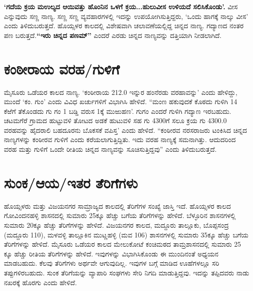 \textbf{‘ಗದೆಯ ಕ್ರಯ ಮಉಲ್ಯದ ಆಯಿವತ್ತು ಹೊಂನಿನ ಒಳಗೆ ಕ್ರಯ...ಹುಲುವೀಸ ಉಳಿಯದೆ ಸಲಿಸಿಕೊಂಡು’.} ವೀಸ ಎನ್ನುವುದು ಸಣ್ಣ ನಾಣ್ಯ. ಸಣ್ಣ ಸಣ್ಣ ವ್ಯವಹಾರಗಳಲ್ಲಿ ಇದನ್ನು ಉಪಯೋಗಿಸುತ್ತಿದ್ದರು, ‘ಒಂದು ಹಾಗಕ್ಕೆ ನಾಲ್ಕು ವೀಸ’ ಎಂದು ತಿಳಿದುಬರುತ್ತದೆ. ಹೊಯ್ಸಳರ ಕಾಲದಲ್ಲಿ ವಿಶೇಷವಾಗಿ ಚಲಾವಣೆಯಲ್ಲಿದ್ದ ಚಿನ್ನದ ನಾಣ್ಯ. ಗದ್ಯಾಣದ ನಂತರ ಪಣ ಬರುತ್ತದೆ.\textbf{“ಇರು ಚಿನ್ನದ ಪಣಮ್”} ಎಂದರೆ ಎರಡು ಚಿನ್ನದ ನಾಣ್ಯವನ್ನು ದತ್ತಿಯಾಗಿ ನೀಡಲಾಗಿದೆ.


\section{ಕಂಠೀರಾಯ ವರಹ/ಗುಳಿಗೆ}

ಮೈಸೂರು ಒಡೆಯರ ಕಾಲದ ನಾಣ್ಯ. ‘ಕಂಠೀರಾಯ 212.0 ಇನ್ನುರ ಹಂನೆರಡು ವರಹಾವನ್ನು’ ಎಂದು ಹೇಳಿದ್ದು, ಮುಂದೆ ‘ಕಂ. ಗುಂ’ ಎಂದು ವಿವಿಧ ಖರ್ಚುಗಳಿಗೆ ವಿಭಾಗಿಸಿ ಹೇಳಿದೆ. “ಮಂಣ ಹಕುವುದಕೆ ಕೊಠದು ಗುಳಿಗಿ 14 ಕೆಱೆಗೆ ತೆಕೊಂಡದು ಗು ಗಂ 1 ಬಡ್ಡಿ ವರುಸ 1ಕ್ಕೆ ಮುಱುಹಣ’. ಗುಗಂ ಎಂದರೆ ಗುಳಿಗಿ ಗದ್ಯಾಣ ಇರಬಹುದು. ಚಟಮಗೆರೆ ಗ್ರಾಮದ ಹುಟ್ಟುವಳಿ ತೋಟದ ಅಡಕೆ ಹುಟುವಳಿ ಸಹ ಗು 4300ಗೆ ಸಲೂ ಕ್ರಯ ಗು 4300.0 ವರಹವನ್ನು ಹೈದರಾಲಿ ಬಹದೂರನು ಬೊಕಸಕೆ ವಪಿಸ್ತ’ ಎಂದು ಹೇಳಿದೆ. “ಕಂಠೀರವ ನರಸರಾಜರು ಟಂಕಿಸಿದ ಚಿನ್ನದ ನಾಣ್ಯಗಳನ್ನು ಕಂಠೀರವ ಗುಳಿಗೆ ಎಂದು ಕರೆಯಲಾಗುತ್ತಿದ್ದಿತು. ಇದು ವರಹ ನಾಣ್ಯಕ್ಕೆ ಸಮನಾಗಿತ್ತು. ಆದುದರಿಂದ ವರಹ ಮತ್ತು ಗುಳಿಗೆ ಒಂದೇ ರೀತಿಯ ಚಿನ್ನದ ನಾಣ್ಯವನ್ನು ಸೂಚಿಸುತ್ತಿದ್ದವು” ಎಂದು ತಿಳಿದುಬರುತ್ತದೆ.


\section{ಸುಂಕ/ಆಯ/ಇತರ ತೆರಿಗೆಗಳು}

ಹೊಯ್ಸಳರು ಮತ್ತು ವಿಜಯನಗರ ಸಾಮ್ರಾಜ್ಯದ ಕಾಲದಲ್ಲಿ ತೆರಿಗೆಗಳ ಸಂಖ್ಯೆ ಜಾಸ್ತಿ ಇದೆ. ಹೊಯ್ಸಳರ ಕಾಲದ ಗೋವಿಂದನಹಳ್ಳಿ ಶಾಸನದಲ್ಲಿ ಸುಮಾರು 25ಕ್ಕೂ ಹೆಚ್ಚು ಬಗೆಯ ತೆರಿಗೆಗಳನ್ನು ಹೇಳಿದೆ. ಬೆಳ್ಳೂರಿನ ಶಾಸನಗಳಲ್ಲಿ ಸುಮಾರು 20ಕ್ಕೂ ಹೆಚ್ಚು ತೆರಿಗೆಗಳನ್ನು ಹೇಳಿದೆ. ವಿಜಯನಗರ ಕಾಲದ, ಮದ್ದೂರು ತಾಲ್ಲೂಕು, ಬೊಪ್ಪಸಂದ್ರ (ಮದ್ದೂರು 110), ಮಳವಳ್ಳಿ ತಾಲ್ಲೂಕಿನ ಮುಟ್ಣಹಳ್ಳಿ (ಮವ 106) ಶಾಸನಗಳಲ್ಲಿ ಸುಮಾರು 35ಕ್ಕೂ ಹೆಚ್ಚು ಬಗೆಯ ತೆರಿಗೆಗಳನ್ನು ಹೇಳಿದೆ. ಮೈಸೂರು ಒಡೆಯರ ಕಾಲದ ಮೇಲುಕೋಟೆ ಕಂಚಿಮಠದ ತಾಮ್ರಶಾಸನದಲ್ಲಿ ಸುಮಾರು 25 ಕ್ಕೂ ಹೆಚ್ಚು ರೀತಿಯ ತೆರಿಗೆಗಳನ್ನು ಹೇಳಿದೆ. ಇವುಗಳನ್ನು ವಿಭಾಗಿಸಿಕೊಂಡು ಈ ಮುಂದಿನಂತೆ ಅಧ್ಯಯನ ಮಾಡಬಹುದು. ಕೆಲವು ತೆರಿಗೆಗಳು ಅರ್ಥವೇ ಆಗುವುದಿಲ್ಲ. ಇವುಗಳ ಬಗ್ಗೆ ಮಾಡಿದ ಊಹೆಗಳಲ್ಲೂ ಸರಿ ತಪ್ಪುಗಳಿರಬಹುದು. ಸುಂಕ ತೆರಿಗೆಯನ್ನು ವ್ಯಾಪಾರಿ ಸಂಘಗಳು ಸೇರಿ ನಿಗದಿ ಮಾಡುತ್ತಿದ್ದವು. ಇದನ್ನು ತಪ್ಪಿದವರು ನಾಡು ನಖರಕ್ಕೆ ಹೊರಗು ಎಂದು ಹೇಳಿದೆ.


